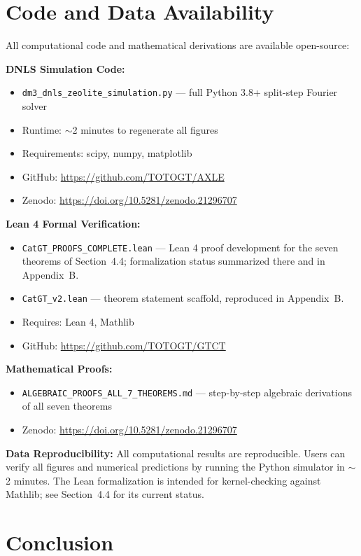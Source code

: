 \documentclass[11pt]{article}
\begin{document}
\section{Code and Data Availability}

All computational code and mathematical derivations are available open-source:

\noindent\textbf{DNLS Simulation Code:}
\begin{itemize}[itemsep=1pt]
\item \texttt{dm3\_dnls\_zeolite\_simulation.py} --- full Python 3.8+ split-step Fourier solver
\item Runtime: $\sim$2 minutes to regenerate all figures
\item Requirements: scipy, numpy, matplotlib
\item GitHub: \url{https://github.com/TOTOGT/AXLE}
\item Zenodo: \url{https://doi.org/10.5281/zenodo.21296707}
\end{itemize}

\noindent\textbf{Lean 4 Formal Verification:}
\begin{itemize}[itemsep=1pt]
\item \texttt{CatGT\_PROOFS\_COMPLETE.lean} --- Lean 4 proof development for the seven theorems of Section~4.4; formalization status summarized there and in Appendix~B.
\item \texttt{CatGT\_v2.lean} --- theorem statement scaffold, reproduced in Appendix~B.
\item Requires: Lean 4, Mathlib
\item GitHub: \url{https://github.com/TOTOGT/GTCT}
\end{itemize}

\noindent\textbf{Mathematical Proofs:}
\begin{itemize}[itemsep=1pt]
\item \texttt{ALGEBRAIC\_PROOFS\_ALL\_7\_THEOREMS.md} --- step-by-step algebraic derivations of all seven theorems
\item Zenodo: \url{https://doi.org/10.5281/zenodo.21296707}
\end{itemize}

\noindent\textbf{Data Reproducibility:} All computational results are reproducible. Users can verify all figures and numerical predictions by running the Python simulator in $\sim$2 minutes. The Lean formalization is intended for kernel-checking against Mathlib; see Section~4.4 for its current status.

\section{Conclusion}
\end{document}
